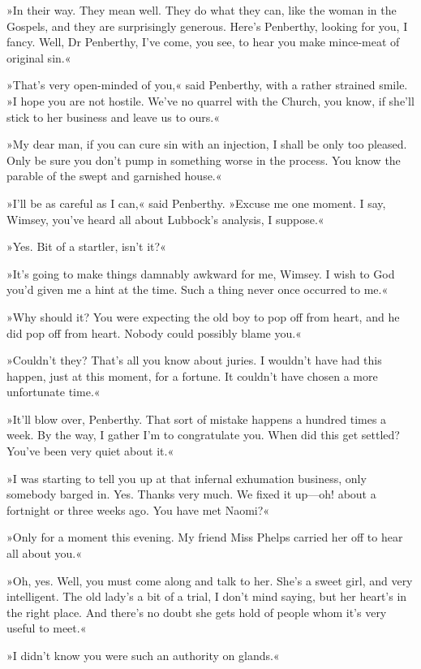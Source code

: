 »In their way. They mean well. They do what they can, like the woman in the Gospels, and they are surprisingly generous. Here's Penberthy, looking for you, I fancy. Well, Dr Penberthy, I've come, you see, to hear you make mince-meat of original sin.«

»That's very open-minded of you,« said Penberthy, with a rather strained smile. »I hope you are not hostile. We've no quarrel with the Church, you know, if she'll stick to her business and leave us to ours.«

»My dear man, if you can cure sin with an injection, I shall be only too pleased. Only be sure you don't pump in something worse in the process. You know the parable of the swept and garnished house.«

»I'll be as careful as I can,« said Penberthy. »Excuse me one moment. I say, Wimsey, you've heard all about Lubbock's analysis, I suppose.«

»Yes. Bit of a startler, isn't it?«

»It's going to make things damnably awkward for me, Wimsey. I wish to God you'd given me a hint at the time. Such a thing never once occurred to me.«

»Why should it? You were expecting the old boy to pop off from heart, and he did pop off from heart. Nobody could possibly blame you.«

»Couldn't they? That's all you know about juries. I wouldn't have had this happen, just at this moment, for a fortune. It couldn't have chosen a more unfortunate time.«

»It'll blow over, Penberthy. That sort of mistake happens a hundred times a week. By the way, I gather I'm to congratulate you. When did this get settled? You've been very quiet about it.«

»I was starting to tell you up at that infernal exhumation business, only somebody barged in. Yes. Thanks very much. We fixed it up—oh! about a fortnight or three weeks ago. You have met Naomi?«

»Only for a moment this evening. My friend Miss Phelps carried her off to hear all about you.«

»Oh, yes. Well, you must come along and talk to her. She's a sweet girl, and very intelligent. The old lady's a bit of a trial, I don't mind saying, but her heart's in the right place. And there's no doubt she gets hold of people whom it's very useful to meet.«

»I didn't know you were such an authority on glands.«


